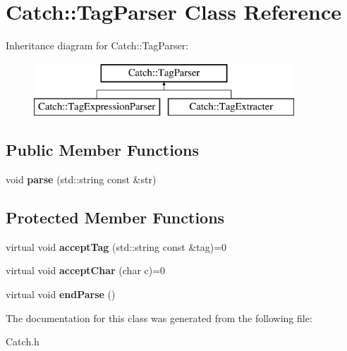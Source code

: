 \hypertarget{class_catch_1_1_tag_parser}{\section{Catch\-:\-:Tag\-Parser Class Reference}
\label{class_catch_1_1_tag_parser}
}
Inheritance diagram for Catch\-:\-:Tag\-Parser\-:\begin{figure}[H]
\begin{center}
\leavevmode
\includegraphics[height=2.000000cm]{class_catch_1_1_tag_parser}
\end{center}
\end{figure}
\subsection*{Public Member Functions}
\begin{DoxyCompactItemize}
\item 
\hypertarget{class_catch_1_1_tag_parser_afc37c4ca179f183d1fa46e703acd244f}{void {\bfseries parse} (std\-::string const \&str)}\label{class_catch_1_1_tag_parser_afc37c4ca179f183d1fa46e703acd244f}

\end{DoxyCompactItemize}
\subsection*{Protected Member Functions}
\begin{DoxyCompactItemize}
\item 
\hypertarget{class_catch_1_1_tag_parser_ad10e947a1e3e23df86cf5d2e7f8ac86b}{virtual void {\bfseries accept\-Tag} (std\-::string const \&tag)=0}\label{class_catch_1_1_tag_parser_ad10e947a1e3e23df86cf5d2e7f8ac86b}

\item 
\hypertarget{class_catch_1_1_tag_parser_a39660c883ef0dc71fc79f067b2832a27}{virtual void {\bfseries accept\-Char} (char c)=0}\label{class_catch_1_1_tag_parser_a39660c883ef0dc71fc79f067b2832a27}

\item 
\hypertarget{class_catch_1_1_tag_parser_ac26ddd9fe8289b13058bb3e96cc6027a}{virtual void {\bfseries end\-Parse} ()}\label{class_catch_1_1_tag_parser_ac26ddd9fe8289b13058bb3e96cc6027a}

\end{DoxyCompactItemize}


The documentation for this class was generated from the following file\-:\begin{DoxyCompactItemize}
\item 
Catch.\-h\end{DoxyCompactItemize}
